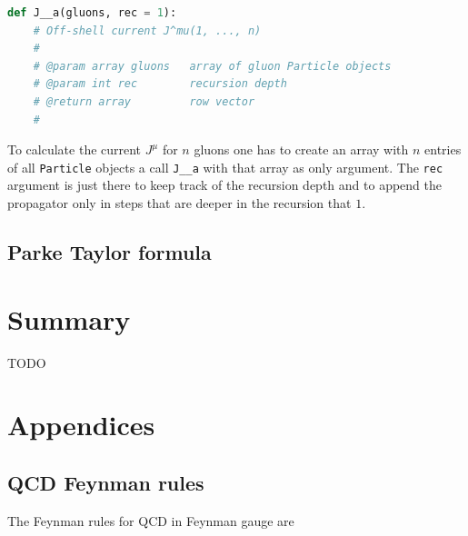 \documentclass{article}
\theoremstyle{definition}
\def\code#1{\texttt{#1}}
\numberwithin{equation}{section}
\begin{document}
\begin{lstlisting}[language=Python, caption=Berends-Giele current]
def J__a(gluons, rec = 1):
    # Off-shell current J^mu(1, ..., n)
    #
    # @param array gluons   array of gluon Particle objects
    # @param int rec        recursion depth
    # @return array         row vector
    #
\end{lstlisting}

To calculate the current $J^{\mu}$ for $n$ gluons one has to create an array with $n$ entries of all \code{Particle} objects a call \code{J\_\_a} with that array as only argument. The \code{rec} argument is just there to keep track of the recursion depth and to append the propagator only in steps that are deeper in the recursion that $1$.

\subsection{Parke Taylor formula}

\section{Summary}

TODO

\newpage




\newpage

\appendix
\section*{Appendices}
\renewcommand{\thesubsection}{\Alph{subsection}}

\subsection{QCD Feynman rules}
\label{sec:frules}

The Feynman rules for QCD in Feynman gauge are \cite{mangano99}
\end{document}
